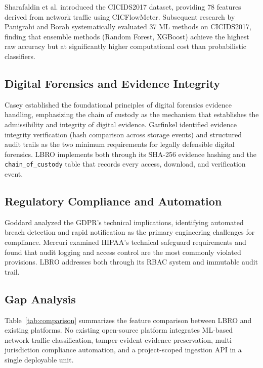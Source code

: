 \documentclass[conference]{IEEEtran}
\begin{document}
Sharafaldin et al. \cite{sharafaldin2018cicids} introduced the CICIDS2017 dataset, providing 78 features derived from network traffic using CICFlowMeter. Subsequent research by Panigrahi and Borah \cite{panigrahi2018survey} systematically evaluated 37 ML methods on CICIDS2017, finding that ensemble methods (Random Forest, XGBoost) achieve the highest raw accuracy but at significantly higher computational cost than probabilistic classifiers.

\subsection{Digital Forensics and Evidence Integrity}

Casey \cite{casey2011digital} established the foundational principles of digital forensics evidence handling, emphasizing the chain of custody as the mechanism that establishes the admissibility and integrity of digital evidence. Garfinkel \cite{garfinkel2010dfr} identified evidence integrity verification (hash comparison across storage events) and structured audit trails as the two minimum requirements for legally defensible digital forensics. LBRO implements both through its SHA-256 evidence hashing and the \texttt{chain\_of\_custody} table that records every access, download, and verification event.

\subsection{Regulatory Compliance and Automation}

Goddard \cite{goddard2017gdpr} analyzed the GDPR's technical implications, identifying automated breach detection and rapid notification as the primary engineering challenges for compliance. Mercuri \cite{mercuri2004hipaa} examined HIPAA's technical safeguard requirements and found that audit logging and access control are the most commonly violated provisions. LBRO addresses both through its RBAC system and immutable audit trail.

\subsection{Gap Analysis}

Table~\ref{tab:comparison} summarizes the feature comparison between LBRO and existing platforms. No existing open-source platform integrates ML-based network traffic classification, tamper-evident evidence preservation, multi-jurisdiction compliance automation, and a project-scoped ingestion API in a single deployable unit.
\end{document}
